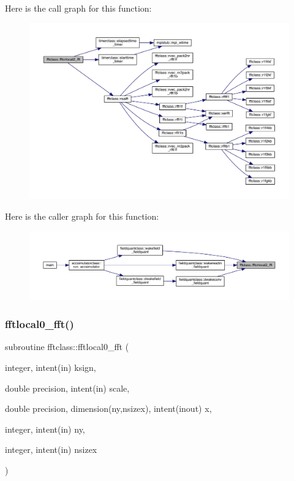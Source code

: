 Here is the call graph for this function\+:\nopagebreak
\begin{figure}[H]
\begin{center}
\leavevmode
\includegraphics[width=350pt]{namespacefftclass_a62d05d7b0980c823708d03f4a1520c1e_cgraph}
\end{center}
\end{figure}
Here is the caller graph for this function\+:\nopagebreak
\begin{figure}[H]
\begin{center}
\leavevmode
\includegraphics[width=350pt]{namespacefftclass_a62d05d7b0980c823708d03f4a1520c1e_icgraph}
\end{center}
\end{figure}
\mbox{\label{namespacefftclass_a501325267c1425bfece04a18e20efe31}} 
\subsubsection{\texorpdfstring{fftlocal0\_fft()}{fftlocal0\_fft()}}
{\footnotesize\ttfamily subroutine fftclass\+::fftlocal0\+\_\+fft (\begin{DoxyParamCaption}\item[{integer, intent(in)}]{ksign,  }\item[{double precision, intent(in)}]{scale,  }\item[{double precision, dimension(ny,nsizex), intent(inout)}]{x,  }\item[{integer, intent(in)}]{ny,  }\item[{integer, intent(in)}]{nsizex }\end{DoxyParamCaption})}

